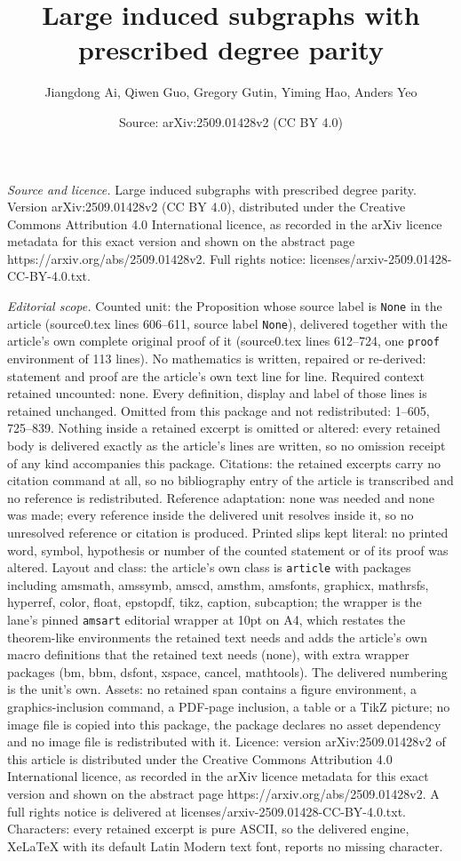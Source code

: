 \documentclass[10pt,a4paper]{amsart}
\title[Large induced subgraphs with prescribed degree parity]{Large induced subgraphs with prescribed degree parity}
\author{Jiangdong Ai, Qiwen Guo, Gregory Gutin, Yiming Hao, Anders Yeo}
\date{Source: arXiv:2509.01428v2 (CC BY 4.0)}
\begin{document}
\maketitle

\noindent\emph{Source and licence.} Large induced subgraphs with prescribed degree parity. Version arXiv:2509.01428v2 (CC BY 4.0), distributed under the Creative Commons Attribution 4.0 International licence, as recorded in the arXiv licence metadata for this exact version and shown on the abstract page https://arxiv.org/abs/2509.01428v2. Full rights notice: licenses/arxiv-2509.01428-CC-BY-4.0.txt.\par\smallskip

\noindent\textit{Editorial scope.} Counted unit: the Proposition whose source label is \texttt{None} in the article (source0.tex lines 606--611, source label \texttt{None}), delivered together with the article's own complete original proof of it (source0.tex lines 612--724, one \texttt{proof} environment of 113 lines). No mathematics is written, repaired or re-derived: statement and proof are the article's own text line for line. Required context retained uncounted: none. Every definition, display and label of those lines is retained unchanged. Omitted from this package and not redistributed: 1--605, 725--839. Nothing inside a retained excerpt is omitted or altered: every retained body is delivered exactly as the article's lines are written, so no omission receipt of any kind accompanies this package. Citations: the retained excerpts carry no citation command at all, so no bibliography entry of the article is transcribed and no reference is redistributed. Reference adaptation: none was needed and none was made; every reference inside the delivered unit resolves inside it, so no unresolved reference or citation is produced. Printed slips kept literal: no printed word, symbol, hypothesis or number of the counted statement or of its proof was altered. Layout and class: the article's own class is \texttt{article} with packages including amsmath, amssymb, amscd, amsthm, amsfonts, graphicx, mathrsfs, hyperref, color, float, epstopdf, tikz, caption, subcaption; the wrapper is the lane's pinned \texttt{amsart} editorial wrapper at 10pt on A4, which restates the theorem-like environments the retained text needs and adds the article's own macro definitions that the retained text needs (none), with extra wrapper packages (bm, bbm, dsfont, xspace, cancel, mathtools). The delivered numbering is the unit's own. Assets: no retained span contains a figure environment, a graphics-inclusion command, a PDF-page inclusion, a table or a TikZ picture; no image file is copied into this package, the package declares no asset dependency and no image file is redistributed with it. Licence: version arXiv:2509.01428v2 of this article is distributed under the Creative Commons Attribution 4.0 International licence, as recorded in the arXiv licence metadata for this exact version and shown on the abstract page https://arxiv.org/abs/2509.01428v2. A full rights notice is delivered at licenses/arxiv-2509.01428-CC-BY-4.0.txt. Characters: every retained excerpt is pure ASCII, so the delivered engine, XeLaTeX with its default Latin Modern text font, reports no missing character.
\end{document}
